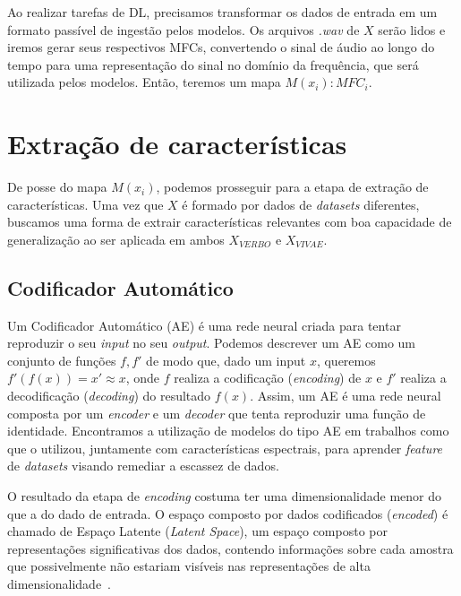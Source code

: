 Ao realizar tarefas de \acrshort{DL}, precisamos transformar os dados de entrada em um formato passível de ingestão pelos modelos. Os arquivos \textit{.wav} de $X$ serão lidos e iremos gerar seus respectivos \acrshort{MFC}s, convertendo o sinal de áudio ao longo do tempo para uma representação do sinal no domínio da frequência, que será utilizada pelos modelos. Então, teremos um mapa $M(x_i): MFC_i$.


\section{Extração de características}

De posse do mapa $M(x_i)$, podemos prosseguir para a etapa de extração de características. Uma vez que $X$ é formado por dados de \textit{datasets} diferentes, buscamos uma forma de extrair características relevantes com boa capacidade de generalização ao ser aplicada em ambos $X_{VERBO}$ e $X_{VIVAE}$.

\subsection{Codificador Automático}

Um Codificador Automático (\acrshort{AE}) é uma rede neural criada para tentar reproduzir o seu \textit{input} no seu \textit{output}. Podemos descrever um \acrshort{AE} como um conjunto de funções $f, f'$ de modo que, dado um input $x$, queremos $f'(f(x)) = x' \approx x$, onde $f$ realiza a codificação (\textit{encoding}) de $x$ e $f'$ realiza a decodificação (\textit{decoding}) do resultado $f(x)$. Assim, um \acrlong{AE} é uma rede neural composta por um \textit{encoder} e um \textit{decoder} que tenta reproduzir uma função de identidade. Encontramos a utilização de modelos do tipo \acrshort{AE} em trabalhos como \cite{34} que o utilizou, juntamente com características espectrais, para aprender \textit{feature} de \textit{datasets} visando remediar a escassez de dados.


O resultado da etapa de \textit{encoding} costuma ter uma dimensionalidade menor do que a do dado de entrada. O espaço composto por dados codificados (\textit{encoded}) é chamado de Espaço Latente (\textit{Latent Space}), um espaço composto por representações significativas dos dados, contendo informações sobre cada amostra que possivelmente não estariam visíveis nas representações de alta dimensionalidade~\cite{60}.

